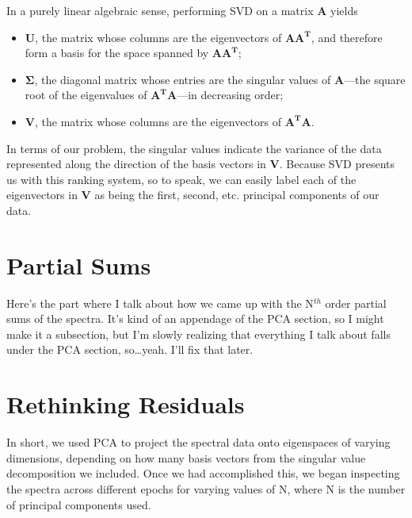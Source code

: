 \documentclass{article}
\newcommand{\mtx}[1]{$\mathbf{#1}$}
\begin{document}
  In a purely linear algebraic sense, performing SVD on a matrix
  \mtx{A} yields
  
  \begin{itemize}
  \item \mtx{U}, the matrix whose columns are the eigenvectors of
    \mtx{AA^{T}}, and therefore form a basis for the space spanned by
    \mtx{AA^{T}};
  \item \mtx{\Sigma}, the diagonal matrix whose entries are the
    singular values of \mtx{A}---the square root of the eigenvalues
    of \mtx{A^{T}A}---in decreasing order;
  \item \mtx{V}, the matrix whose columns are the eigenvectors of
    \mtx{A^{T}A}.
  \end{itemize}

  In terms of our problem, the singular values indicate the variance
  of the data represented along the direction of the basis vectors in
  \mtx{V}.  Because SVD presents us with this ranking system, so to
  speak, we can easily label each of the eigenvectors in \mtx{V} as
  being the first, second, etc. principal components of our data.



\section{Partial Sums}
\label{sec:recons}

Here's the part where I talk about how we came up with the N$^{th}$
order partial sums of the spectra.  It's kind of an appendage of the
PCA section, so I might make it a subsection, but I'm slowly
realizing that everything I talk about falls under the PCA section,
so\dots yeah.  I'll fix that later.



\section{Rethinking Residuals}
\label{sec:residuals}

In short, we used PCA to project the spectral data onto eigenspaces of
varying dimensions, depending on how many basis vectors from the
singular value decomposition we included.  Once we had accomplished
this, we began inspecting the spectra across different epochs for
varying values of N, where N is the number of principal components
used.
\end{document}
